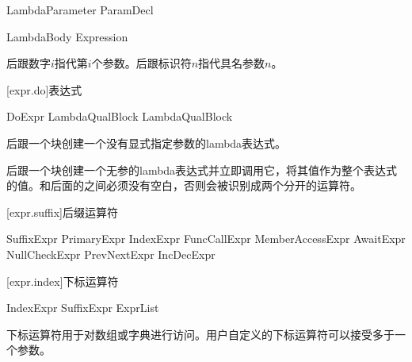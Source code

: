 \begin{bnf}{LambdaParameter}
    ParamDecl
\end{bnf}

\begin{bnf}{LambdaBody}
    Expression
\end{bnf}

\pnum
\tcode{\$}后跟数字$i$指代第$i$个参数。\tcode{\$}后跟标识符$n$指代具名参数$n$。

[expr.do]{表达式}

\begin{bnf}{DoExpr}
     LambdaQual\bnfs Block \br
     LambdaQual\bnfs Block
\end{bnf}

\pnum
{}后跟一个块创建一个没有显式指定参数的lambda表达式。

\pnum
{}后跟一个块创建一个无参的lambda表达式并立即调用它，将其值作为整个表达式的值。\enternote {}和后面的\tcode{!}之间必须没有空白，否则会被识别成两个分开的运算符。\exitnote

\enterexample
{}
\exitexample

[expr.suffix]{后缀运算符}

\begin{bnf}{SuffixExpr}
    PrimaryExpr \br
    IndexExpr \br
    FuncCallExpr \br
    MemberAccessExpr \br
    AwaitExpr \br
    NullCheckExpr \br
    PrevNextExpr \br
    IncDecExpr
\end{bnf}

[expr.index]{下标运算符}

\begin{bnf}{IndexExpr}
    SuffixExpr \terminal{[} ExprList\bnfq \terminal{]}
\end{bnf}

\pnum
下标运算符用于对数组或字典进行访问。用户自定义的下标运算符可以接受多于一个参数。

